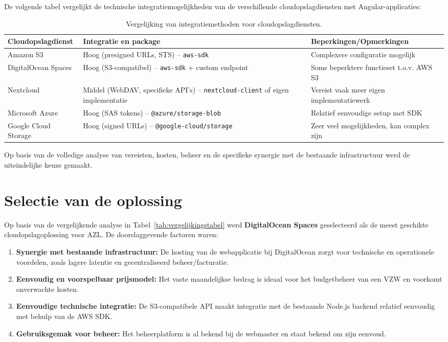 De volgende tabel vergelijkt de technische integratiemogelijkheden van de verschillende cloudopslagdiensten met Angular-applicaties:

\begin{table}[H]
    \centering
    \footnotesize
    \begin{tabular}{l p{5cm} p{5cm}}
      \toprule
      \textbf{Cloudopslagdienst} & \textbf{Integratie en package} & \textbf{Beperkingen/Opmerkingen} \\
      \midrule
      Amazon S3 & Hoog (presigned URLs, STS) – \texttt{aws-sdk} & Complexere configuratie mogelijk \\
      DigitalOcean Spaces & Hoog (S3-compatibel) – \texttt{aws-sdk} + custom endpoint & Soms beperktere functieset t.o.v. AWS S3 \\
      Nextcloud & Middel (WebDAV, specifieke API's) – \texttt{nextcloud-client} of eigen implementatie & Vereist vaak meer eigen implementatiewerk \\
      Microsoft Azure & Hoog (SAS tokens) – \texttt{@azure/storage-blob} & Relatief eenvoudige setup met SDK \\
      Google Cloud Storage & Hoog (signed URLs) – \texttt{@google-cloud/storage} & Zeer veel mogelijkheden, kan complex zijn \\
      \bottomrule
    \end{tabular}
    \caption[Vergelijking cloudintegraties]{\label{tab:cloud-integratie-vergelijking}Vergelijking van integratiemethoden voor cloudopslagdiensten.}
\end{table}

Op basis van de volledige analyse van vereisten, kosten, beheer en de specifieke synergie met de bestaande infrastructuur werd de uiteindelijke keuze gemaakt.

\section{Selectie van de oplossing}
Op basis van de vergelijkende analyse in Tabel~\ref{tab:vergelijkingstabel} werd \textbf{DigitalOcean Spaces} geselecteerd als de meest geschikte cloudopslagoplossing voor AZL. De doorslaggevende factoren waren:
\begin{enumerate}
    \item \textbf{Synergie met bestaande infrastructuur:} De hosting van de webapplicatie bij DigitalOcean zorgt voor technische en operationele voordelen, zoals lagere latentie en gecentraliseerd beheer/facturatie.
    \item \textbf{Eenvoudig en voorspelbaar prijsmodel:} Het vaste maandelijkse bedrag is ideaal voor het budgetbeheer van een VZW en voorkomt onverwachte kosten.
    \item \textbf{Eenvoudige technische integratie:} De S3-compatibele API maakt integratie met de bestaande Node.js backend relatief eenvoudig met behulp van de AWS SDK.
    \item \textbf{Gebruiksgemak voor beheer:} Het beheerplatform is al bekend bij de webmaster en staat bekend om zijn eenvoud.
\end{enumerate}

